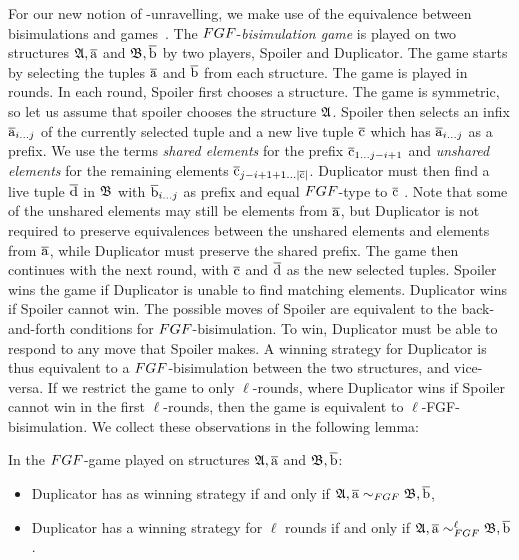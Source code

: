 For our new notion of \FGF-unravelling, we make use of the equivalence between bisimulations and games~\cite[Sec. 1.2.1]{Gradel014}.
The $\FGF$-\emph{bisimulation game} is played on two  structures ${\mathfrak{A}}, \overline{\mathrm{a}}$ and ${\mathfrak{B}}, \overline{\mathrm{b}}$ by two players, Spoiler and Duplicator.
The game starts by selecting the tuples $\overline{\mathrm{a}}$ and $\overline{\mathrm{b}}$ from each structure.
The game is played in rounds.
In each round, Spoiler first chooses a structure.
The game is symmetric, so let us assume that spoiler chooses the structure ${\mathfrak{A}}$.
Spoiler then selects an infix $\overline{\mathrm{a}}_{i\ldots j}$ of the currently selected tuple and a new live tuple $\overline{\mathrm{c}}$ which has $\overline{\mathrm{a}}_{i\ldots j}$ as a prefix.
We use the terms \emph{shared elements} for the prefix $\overline{\mathrm{c}}_{1\ldots j-i+1}$ and \emph{unshared elements} for the remaining elements $\overline{\mathrm{c}}_{j-i+1+1\ldots|\overline{\mathrm{c}}|}$.
Duplicator must then find a live tuple $\overline{\mathrm{d}}$ in ${\mathfrak{B}}$ with $\overline{\mathrm{b}}_{i\ldots j}$ as prefix and equal $\FGF$-type to $\overline{\mathrm{c}}$ .
Note that some of the unshared elements may still be elements from $\overline{\mathrm{a}}$, but Duplicator is not required to preserve equivalences between the unshared elements and elements from $\overline{\mathrm{a}}$, while Duplicator must preserve the shared prefix. 
The game then continues with the next round, with $\overline{\mathrm{c}}$ and $\overline{\mathrm{d}}$ as the new selected  tuples.
Spoiler wins the game if Duplicator is unable to find matching elements.
Duplicator wins if Spoiler cannot win.
 The possible moves of Spoiler are equivalent to the back-and-forth conditions for $\FGF$-bisimulation. 
To win, Duplicator must be able to respond to any move that Spoiler makes.
 A winning strategy for Duplicator is thus equivalent to a $\FGF$-bisimulation between the two structures, and vice-versa.
If we restrict the game to only $\ell$-rounds, where  Duplicator wins if Spoiler cannot win in the first $\ell$-rounds, then the game is equivalent  to  $\ell$-FGF-bisimulation.
We collect these observations in the following lemma:

\begin{lemma}
  In the $\FGF$-game played on structures ${\mathfrak{A}}, \overline{\mathrm{a}}$ and ${\mathfrak{B}}, \overline{\mathrm{b}}$:
  \begin{itemize}
    \item Duplicator has as winning strategy if and only if $\str{A}, \elemtuplea \bisimto_{\FGF} \str{B}, \elemtupleb$,
    \item Duplicator has a winning strategy for $\ell$ rounds if and only if $\str{A}, \elemtuplea \bisimto_{\FGF}^{\ell} \str{B}, \elemtupleb$.
  \end{itemize}
\end{lemma}

